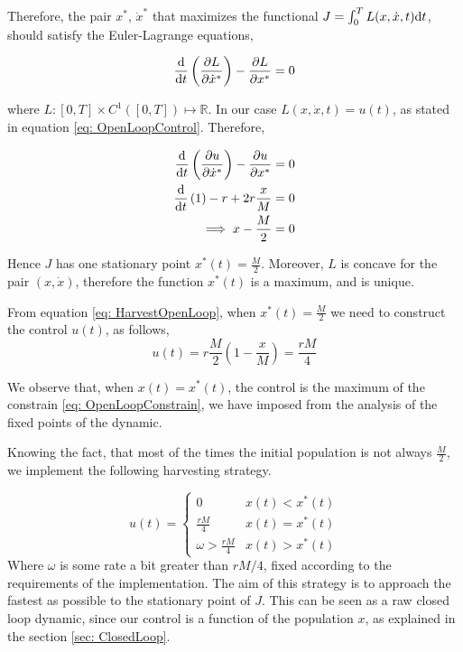 Therefore, the pair $x^*$, $\dot{x}^*$ that maximizes the functional $J=\int_0^T L(x, \dot{x}, t)\mathrm{d} t$, should satisfy the Euler-Lagrange equations,

\begin{equation}
	\frac{\mathrm{d} }{{\mathrm{d} t}}\left(\frac{\partial L}{{\partial \dot{x}^*}}\right)-\frac{\partial L}{{\partial x^*}}=0
\end{equation}

where $L:[0,T]\times C^1([0,T]) \mapsto \mathbb{R}$. In our case $L(x,\dot{x}, t)=u(t)$, as stated in equation \ref{eq: OpenLoopControl}. Therefore,

\begin{align}
	\frac{\mathrm{d} }{{\mathrm{d} t}}\left(\frac{\partial u}{{\partial \dot{x}^*}}\right)-\frac{\partial u}{{\partial x^*}}&=0 \nonumber\\ \frac{\mathrm{d} }{{\mathrm{d} t}}\left(1\right)-r+2r\frac{x}{M}&=0 \nonumber\\
	\implies x- \frac{M}{2}&=0
\end{align}

Hence $J$ has one stationary point $x^*(t)=\frac{M}{2}$. Moreover, $L$ is concave for the pair $(x, \dot{x})$, therefore the function $x^*(t)$ is a maximum, and is unique. 

From equation \ref{eq: HarvestOpenLoop}, when $x^*(t)=\frac{M}{2}$ we need to construct the control $u(t)$, as follows,
\begin{equation}
	u(t)=r\frac{M}{2}\left(1-\frac{x}{M}\right)=\frac{rM}{4}
\end{equation}

We observe that, when $x(t)=x^*(t)$, the control is the maximum of the constrain \ref{eq: OpenLoopConstrain}, we have imposed from the analysis of the fixed points of the dynamic. 

Knowing the fact, that most of the times the initial population is not always $\frac{M}{2}$, we implement the following harvesting strategy.

\begin{equation}
	u(t)=\begin{cases}
	0 & x(t)<x^*(t) \\
	\frac{rM}{4} & x(t)=x^*(t) \\
	\omega>\frac{rM}{4} & x(t)>x^*(t)
	\end{cases}
\end{equation}
Where $\omega$ is some rate a bit greater than $rM/4$, fixed according to the requirements of the implementation. The aim of this strategy is to approach the fastest as possible to the stationary point of $J$. This can be seen as a raw closed loop dynamic, since our control is a function of the population $x$, as explained in the section \ref{sec: ClosedLoop}.

